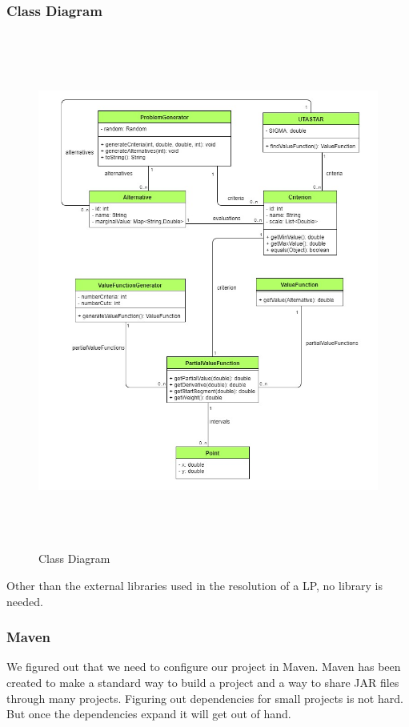 \documentclass{report}
\begin{document}
\subsubsection{Class Diagram}
\begin{figure}[H]
    	\centering
	\includegraphics[width=17cm,height=17cm,keepaspectratio]{diagram-uml.png}
	\caption{Class Diagram}
\end{figure}
Other than the external libraries used in the resolution of a LP, no library is needed. \\

\subsubsection{Maven}
We figured out that we need to configure our project in Maven. Maven has been created to make a standard way to build a project and a way to share JAR files through many projects. Figuring out dependencies for small projects is not hard. But once the dependencies expand it will get out of hand. \\
\end{document}
